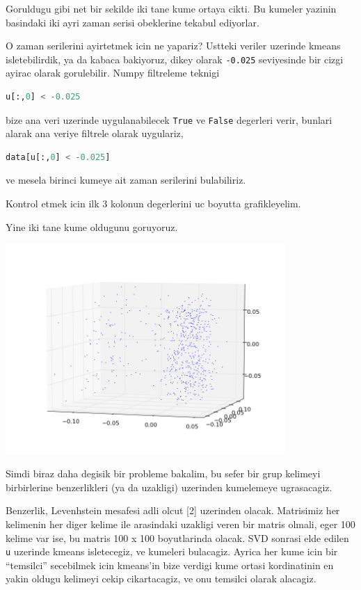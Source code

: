 \documentclass[12pt,fleqn]{article}\usepackage{../common}
\begin{document}
Goruldugu gibi net bir sekilde iki tane kume ortaya cikti. Bu kumeler
yazinin basindaki iki ayri zaman serisi obeklerine tekabul ediyorlar. 

O zaman serilerini ayirtetmek icin ne yapariz? Ustteki veriler uzerinde
kmeans isletebilirdik, ya da kabaca bakiyoruz, dikey olarak \verb!-0.025!
seviyesinde bir cizgi ayirac olarak gorulebilir. Numpy filtreleme teknigi

\begin{lstlisting}[language=Python]
u[:,0] < -0.025
\end{lstlisting}

bize ana veri uzerinde uygulanabilecek \verb!True! ve \verb!False!
degerleri verir, bunlari alarak ana veriye filtrele olarak uygulariz,

\begin{lstlisting}[language=Python]
data[u[:,0] < -0.025]
\end{lstlisting}

ve mesela birinci kumeye ait zaman serilerini bulabiliriz. 

Kontrol etmek icin ilk 3 kolonun degerlerini uc boyutta grafikleyelim.



Yine iki tane kume oldugunu goruyoruz. 

\includegraphics[height=8cm]{3d.png}

Simdi biraz daha degisik bir probleme bakalim, bu sefer bir grup kelimeyi
birbirlerine benzerlikleri (ya da uzakligi) uzerinden kumelemeye ugrasacagiz. 

Benzerlik, Levenhstein mesafesi adli olcut [2] uzerinden olacak. Matrisimiz
her kelimenin her diger kelime ile arasindaki uzakligi veren bir matris
olmali, eger 100 kelime var ise, bu matris 100 x 100 boyutlarinda
olacak. SVD sonrasi elde edilen \verb!u! uzerinde kmeans isletecegiz, ve
kumeleri bulacagiz. Ayrica her kume icin bir ``temsilci'' secebilmek icin
kmeans'in bize verdigi kume ortasi kordinatinin en yakin oldugu kelimeyi
cekip cikartacagiz, ve onu temsilci olarak alacagiz.
\end{document}
